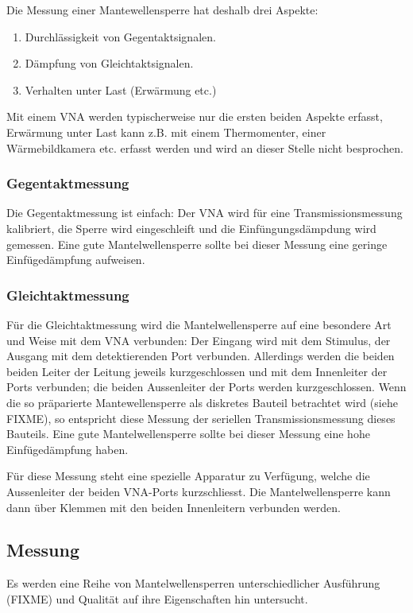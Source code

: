 \documentclass[twoside,a4paper,11pt,halfparskip,DIV=11,notitlepage]{scrartcl}
\begin{document}
Die Messung einer Mantewellensperre hat deshalb drei Aspekte:

\begin{enumerate}
    \item Durchlässigkeit von Gegentaktsignalen.
    \item Dämpfung von Gleichtaktsignalen.
    \item Verhalten unter Last (Erwärmung etc.)
\end{enumerate}

Mit einem VNA werden typischerweise nur die ersten beiden Aspekte erfasst,
Erwärmung unter Last kann z.B. mit einem Thermomenter, einer Wärmebildkamera
etc. erfasst werden und wird an dieser Stelle nicht besprochen.

\subsubsection{Gegentaktmessung}\label{sec:gegentaktmessung}

Die Gegentaktmessung ist einfach: Der VNA wird für eine Transmissionsmessung
kalibriert, die Sperre wird eingeschleift und die Einfüngungsdämpdung wird
gemessen. Eine gute Mantelwellensperre sollte bei dieser Messung eine geringe
Einfügedämpfung aufweisen.

\subsubsection{Gleichtaktmessung}

Für die Gleichtaktmessung wird die Mantelwellensperre auf eine besondere
Art und Weise mit dem VNA verbunden: Der Eingang wird mit dem Stimulus,
der Ausgang mit dem detektierenden Port verbunden. Allerdings werden die
beiden beiden Leiter der Leitung jeweils kurzgeschlossen und mit dem
Innenleiter der Ports verbunden; die beiden Aussenleiter der Ports werden
kurzgeschlossen. Wenn die so präparierte Mantewellensperre als diskretes
Bauteil betrachtet wird (siehe FIXME), so entspricht diese Messung der
seriellen Transmissionsmessung dieses Bauteils. Eine gute Mantelwellensperre
sollte bei dieser Messung eine hohe Einfügedämpfung haben.

Für diese Messung steht eine spezielle Apparatur zu Verfügung, welche die
Aussenleiter der beiden VNA-Ports kurzschliesst. Die Mantelwellensperre
kann dann über  Klemmen mit den beiden Innenleitern verbunden werden.

\subsection{Messung}
Es werden eine Reihe von Mantelwellensperren unterschiedlicher Ausführung
(FIXME) und Qualität auf ihre Eigenschaften hin untersucht. 
\end{document}
